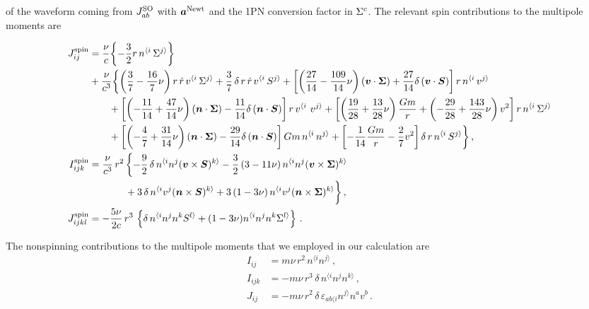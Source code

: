 \documentclass[aps, prd,
twocolumn,%
superscriptaddress,
showpacs, nofootinbib, eqsecnum, amsmath, amssymb, floatfix
]{revtex4}
\begin{document}
of the waveform coming from $J_{ab}^{\rm SO}$ with $\bm{a}^{\rm
Newt}$ and the 1PN conversion factor in $\Sigma^{\rm c}$. The
relevant spin contributions to the multipole moments
are~\cite{Blanchet-Buonanno-Faye:2006}
\begin{widetext}
\begin{subequations}
\begin{align}\label{JijS}
J^{\rm spin}_{ij} &=
\frac{\nu}{c}\biggl\{-\frac{3}{2} r \,n^{\langle
i}\, \Sigma^{ j\rangle}\biggr\}\nonumber\\
&+
\frac{\nu}{c^3}\biggl\{\left(\frac{3}{7}-\frac{16}{7}\nu\right)
r \, \dot r\,v^{\langle i}\, \Sigma^{j\rangle} +
\frac{3}{7} \,\delta \, r \, \dot r
\,v^{\langle i}\,S^{j\rangle} +
\left[\left(\frac{27}{14}-\frac{109}{14}\nu\right)
(\bm{v}\cdot\bm{\Sigma}) + \frac{27}{14} \delta
\,(\bm{v}\cdot\bm{S})\right] r \, n^{\langle
i}\, v^{j\rangle}\nonumber\\
& \qquad  +
\left[\left(-\frac{11}{14}+\frac{47}{14}\nu\right)
(\bm{n}\cdot\bm{\Sigma}) - \frac{11}{14} \delta
\,(\bm{n}\cdot\bm{S})\right]r \,  v^{\langle i} \ v^{j\rangle} +
\left[\left(\frac{19}{28}+\frac{13}{28}\nu\right) \frac{G m}{r} +
\left(-\frac{29}{28}+\frac{143}{28}\nu\right) v^2\right] r \, n^{\langle
i} \, \Sigma^{ j\rangle}\nonumber\\
&\qquad  +
\left[\left(-\frac{4}{7}+\frac{31}{14}\nu\right) (\bm{n}\cdot
\bm{\Sigma}) - \frac{29}{14} \delta
\,(\bm{n}\cdot \bm{S})\right] G m  \, n^{\langle
i}\, n^{j\rangle} + \left[-\frac{1}{14}\frac{G m}{r} -
\frac{2}{7} v^2\right] \delta\, r
\, n^{\langle i}\, S^{j\rangle}\biggr\}\,, \\
I^{\rm spin}_{ijk} &=
\frac{\nu}{c^3} \, r^2 \, \biggl\{-\frac{9}{2}\,\delta
\,n^{\langle i}n^j(\bm{v}\times\bm{S})^{k\rangle}-
\frac{3}{2}\,(3-11\nu)\,n^{\langle i}n^j(\bm{v}\times\bm{\Sigma})^{k\rangle}
\nonumber\\
& \qquad \quad~~ +3\,\delta \,n^{\langle i} v^j(\bm{n}\times\bm{S})^{k\rangle}+
3\,(1-3\nu)\,n^{\langle i}v^j(\bm{n}\times \bm{\Sigma})^{k\rangle}\biggr\} \,,\\
J^{\rm spin}_{ijkl} &=
-\frac{5\nu}{2 c} \, r^3 \, \left\{\delta\, n^{\langle i}n^j n^k S^{l\rangle}+
(1-3\nu)n^{\langle i}n^{j} n^{k}\Sigma^{l\rangle}\right\}\,.
\end{align}
\label{spinmultis}
\end{subequations}
\end{widetext}

The nonspinning contributions to the multipole moments that we employed in our
calculation are
%
\begin{subequations}
 \label{nonspinmultis}
\begin{align}
I_{ij} &=m\nu  \, r^2 \, n^{\langle i}n^{j\rangle}\,, \\
I_{ijk} &= -m\nu\, r^3 \, \delta  \, n^{\langle i} n^j n^{k \rangle}\,, \\
J_{ij} &=- m\nu\, r^2 \,  \delta \,
\varepsilon_{ab\langle i} n^{j\rangle}n^{ a}v^b \,.
\end{align}
\end{subequations}
\end{document}

